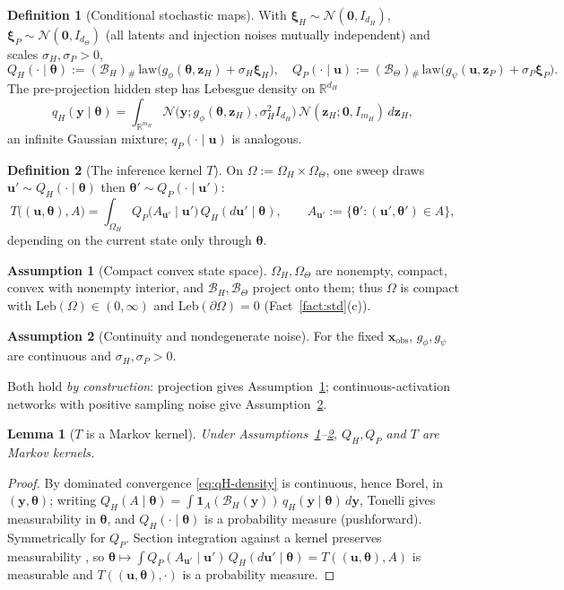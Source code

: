\documentclass[11pt]{article}
\theoremstyle{plain}
\newtheorem{lemma}[theorem]{Lemma}
\theoremstyle{definition}
\newtheorem{definition}{Definition}
\newtheorem{assumption}{Assumption}
\theoremstyle{remark}
\newcommand{\R}{\mathbb{R}}
\newcommand{\Om}{\Omega}
\newcommand{\Leb}{\mathrm{Leb}}
\newcommand{\Normal}{\mathcal{N}}
\newcommand{\xobs}{\bm{x}_{\mathrm{obs}}}
\newcommand{\bth}{\bm{\theta}}
\newcommand{\bu}{\bm{u}}
\newcommand{\push}{{}_{\#}}
\begin{document}
\begin{definition}[Conditional stochastic maps]
\label{def:condmaps}
With $\bm\xi_H\sim\Normal(\bm0,I_{d_H})$, $\bm\xi_P\sim\Normal(\bm0,I_{d_\Theta})$ (all latents and
injection noises mutually independent) and scales $\sigma_H,\sigma_P>0$,
\[
  Q_H(\cdot\mid\bth):=(\mathcal B_H)\push\,\mathrm{law}\big(g_\phi(\bth,\bm z_H)+\sigma_H\bm\xi_H\big),
  \quad
  Q_P(\cdot\mid\bu):=(\mathcal B_\Theta)\push\,\mathrm{law}\big(g_\psi(\bu,\bm z_P)+\sigma_P\bm\xi_P\big).
\]
The pre-projection hidden step has Lebesgue density on $\R^{d_H}$
\begin{equation}\label{eq:qH-density}
  q_H(\bm y\mid\bth)=\int_{\R^{m_H}}\Normal\big(\bm y;g_\phi(\bth,\bm z_H),\sigma_H^2 I_{d_H}\big)\,
  \Normal(\bm z_H;\bm0,I_{m_H})\,d\bm z_H,
\end{equation}
an infinite Gaussian mixture; $q_P(\cdot\mid\bu)$ is analogous.
\end{definition}

\begin{definition}[The inference kernel $T$]
\label{def:T}
On $\Om:=\Om_H\times\Om_\Theta$, one sweep draws $\bu'\sim Q_H(\cdot\mid\bth)$ then
$\bth'\sim Q_P(\cdot\mid\bu')$:
\[
  T\big((\bu,\bth),A\big)=\int_{\Om_H}Q_P\big(A_{\bu'}\mid\bu'\big)\,Q_H(d\bu'\mid\bth),
  \qquad A_{\bu'}:=\{\bth':(\bu',\bth')\in A\},
\]
depending on the current state only through $\bth$.
\end{definition}

\begin{assumption}[Compact convex state space]
\label{ass:compact}
$\Om_H,\Om_\Theta$ are nonempty, compact, convex with nonempty interior, and
$\mathcal B_H,\mathcal B_\Theta$ project onto them; thus $\Om$ is compact with $\Leb(\Om)\in(0,\infty)$
and $\Leb(\partial\Om)=0$ (Fact~\ref{fact:std}(c)).
\end{assumption}
\begin{assumption}[Continuity and nondegenerate noise]
\label{ass:cont}
For the fixed $\xobs$, $g_\phi,g_\psi$ are continuous and $\sigma_H,\sigma_P>0$.
\end{assumption}
\noindent Both hold \emph{by construction}: projection gives Assumption~\ref{ass:compact};
continuous-activation networks with positive sampling noise give Assumption~\ref{ass:cont}.

\begin{lemma}[$T$ is a Markov kernel]
\label{lem:measurable}
Under Assumptions~\ref{ass:compact}--\ref{ass:cont}, $Q_H,Q_P$ and $T$ are Markov kernels.
\end{lemma}
\begin{proof}
By dominated convergence \eqref{eq:qH-density} is continuous, hence Borel, in $(\bm y,\bth)$; writing
$Q_H(A\mid\bth)=\int\mathbf 1_A(\mathcal B_H(\bm y))\,q_H(\bm y\mid\bth)\,d\bm y$, Tonelli gives
measurability in $\bth$, and $Q_H(\cdot\mid\bth)$ is a probability measure (pushforward). Symmetrically
for $Q_P$. Section integration against a kernel preserves measurability \citep[Ch.~1]{kallenberg}, so
$\bth\mapsto\int Q_P(A_{\bu'}\mid\bu')\,Q_H(d\bu'\mid\bth)=T((\bu,\bth),A)$ is measurable and
$T((\bu,\bth),\cdot)$ is a probability measure.
\end{proof}
\end{document}

